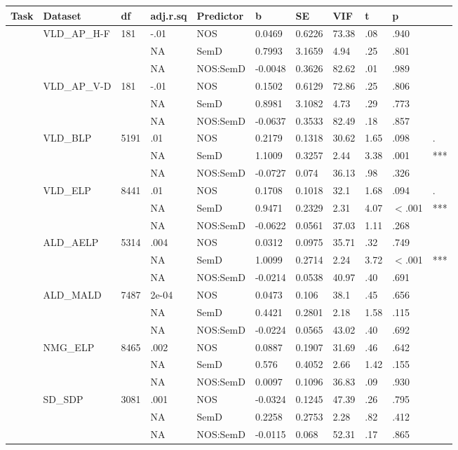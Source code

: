 \begin{table}[ht]
\centering
\begingroup\normalsize
\begin{tabular}{lllllllllll}
  \hline
Task & Dataset & df & adj.r.sq & Predictor & b & SE & VIF & t & p &  \\ 
  \hline
 & VLD\_AP\_H-F & 181 & -.01 & NOS & 0.0469 & 0.6226 & 73.38 & .08 & .940 &   \\ 
   &  &  & NA & SemD & 0.7993 & 3.1659 & 4.94 & .25 & .801 &   \\ 
   &  &  & NA & NOS:SemD & -0.0048 & 0.3626 & 82.62 & .01 & .989 &   \\ 
   & VLD\_AP\_V-D & 181 & -.01 & NOS & 0.1502 & 0.6129 & 72.86 & .25 & .806 &   \\ 
   &  &  & NA & SemD & 0.8981 & 3.1082 & 4.73 & .29 & .773 &   \\ 
   &  &  & NA & NOS:SemD & -0.0637 & 0.3533 & 82.49 & .18 & .857 &   \\ 
   & VLD\_BLP & 5191 & .01 & NOS & 0.2179 & 0.1318 & 30.62 & 1.65 & .098 & . \\ 
   &  &  & NA & SemD & 1.1009 & 0.3257 & 2.44 & 3.38 & .001 & *** \\ 
   &  &  & NA & NOS:SemD & -0.0727 & 0.074 & 36.13 & .98 & .326 &   \\ 
   & VLD\_ELP & 8441 & .01 & NOS & 0.1708 & 0.1018 & 32.1 & 1.68 & .094 & . \\ 
   &  &  & NA & SemD & 0.9471 & 0.2329 & 2.31 & 4.07 & $<$.001 & *** \\ 
   &  &  & NA & NOS:SemD & -0.0622 & 0.0561 & 37.03 & 1.11 & .268 &   \\ 
   & ALD\_AELP & 5314 & .004 & NOS & 0.0312 & 0.0975 & 35.71 & .32 & .749 &   \\ 
   &  &  & NA & SemD & 1.0099 & 0.2714 & 2.24 & 3.72 & $<$.001 & *** \\ 
   &  &  & NA & NOS:SemD & -0.0214 & 0.0538 & 40.97 & .40 & .691 &   \\ 
   & ALD\_MALD & 7487 & 2e-04 & NOS & 0.0473 & 0.106 & 38.1 & .45 & .656 &   \\ 
   &  &  & NA & SemD & 0.4421 & 0.2801 & 2.18 & 1.58 & .115 &   \\ 
   &  &  & NA & NOS:SemD & -0.0224 & 0.0565 & 43.02 & .40 & .692 &   \\ 
   & NMG\_ELP & 8465 & .002 & NOS & 0.0887 & 0.1907 & 31.69 & .46 & .642 &   \\ 
   &  &  & NA & SemD & 0.576 & 0.4052 & 2.66 & 1.42 & .155 &   \\ 
   &  &  & NA & NOS:SemD & 0.0097 & 0.1096 & 36.83 & .09 & .930 &   \\ 
   & SD\_SDP & 3081 & .001 & NOS & -0.0324 & 0.1245 & 47.39 & .26 & .795 &   \\ 
   &  &  & NA & SemD & 0.2258 & 0.2753 & 2.28 & .82 & .412 &   \\ 
   &  &  & NA & NOS:SemD & -0.0115 & 0.068 & 52.31 & .17 & .865 &   \\ 
   \hline
\end{tabular}
\endgroup
\end{table}
